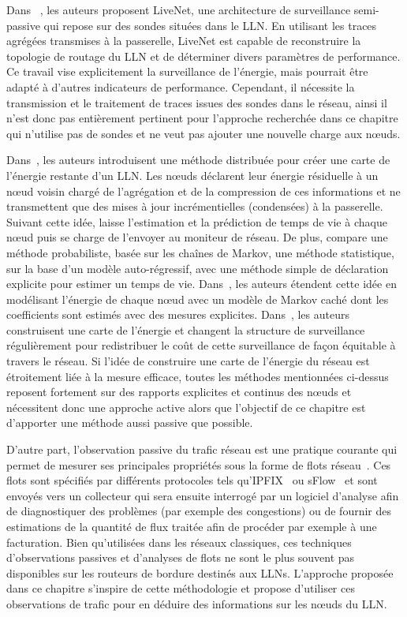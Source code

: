 Dans ~\cite{Chen:2008im}, les auteurs proposent LiveNet, une architecture de surveillance semi-passive  qui repose sur des sondes situées dans le \ac{LLN}.
En utilisant les traces agrégées transmises à la passerelle, LiveNet est capable de reconstruire la topologie de routage du \ac{LLN} et de déterminer divers paramètres de performance.
Ce travail vise explicitement la surveillance de l'énergie, mais pourrait être adapté à d'autres indicateurs de performance.
Cependant, il nécessite la transmission et le traitement de traces issues des sondes dans le réseau, ainsi il n'est donc pas entièrement pertinent pour l'approche recherchée dans ce chapitre qui n'utilise pas de sondes et ne veut pas ajouter une nouvelle charge aux nœuds.

Dans~\cite{Zhao:2002df}, les auteurs introduisent une méthode distribuée pour créer une carte de l'énergie restante d'un \ac{LLN}.
Les nœuds déclarent leur énergie résiduelle à un nœud voisin chargé de l'agrégation et de la compression de ces informations et ne transmettent que des mises à jour incrémentielles (condensées) à la passerelle.
Suivant cette idée, \cite{Mini:2004zj} laisse l'estimation et la prédiction de temps de vie à chaque nœud puis se charge de l'envoyer au moniteur de réseau.
De plus, \cite{Mini:2004zj} compare une méthode probabiliste, basée sur les chaînes de Markov, une méthode statistique, sur la base d'un modèle auto-régressif, avec une  méthode simple de déclaration explicite pour estimer un temps de vie.
Dans~\cite{Hu:2007tb}, les auteurs étendent cette idée en modélisant l'énergie de chaque nœud avec un modèle de Markov caché dont les coefficients sont estimés avec des mesures explicites.
Dans~\cite{Chan:2009hl}, les auteurs construisent une carte de l'énergie et changent la structure de surveillance régulièrement pour redistribuer le coût de cette surveillance de façon équitable à travers le réseau.
Si l'idée de construire une carte de l'énergie du réseau est étroitement liée à la mesure efficace, toutes les méthodes mentionnées ci-dessus reposent fortement sur des rapports  explicites et continus des nœuds et nécessitent donc une approche active alors que l'objectif de ce chapitre est d'apporter une méthode aussi passive que possible.

D'autre part, l'observation passive du trafic réseau est une pratique courante qui permet de mesurer ses principales propriétés sous la forme de flots réseau~\cite{rfc7799}.
Ces flots sont spécifiés par différents protocoles tels qu'IPFIX~\cite{rfc7011} ou sFlow~\cite{phaal2001inmon} et sont envoyés vers un collecteur qui sera ensuite interrogé par un logiciel d'analyse afin de diagnostiquer des problèmes (par exemple des congestions) ou de fournir des estimations de la quantité de flux traitée afin de procéder par exemple à une facturation.
Bien qu'utilisées dans les réseaux classiques, ces techniques d'observations passives et d'analyses de flots ne sont le plus souvent pas disponibles sur les routeurs de bordure destinés aux \ac{LLN}s.
L'approche proposée dans ce chapitre s'inspire de cette méthodologie et propose d'utiliser ces observations de trafic pour en déduire des informations sur les nœuds du \ac{LLN}.

